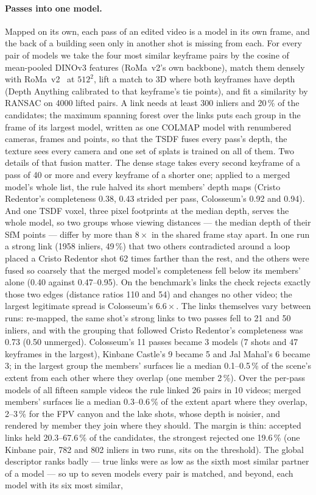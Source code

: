 \documentclass[10pt,a4paper,twocolumn]{article}
\begin{document}
\paragraph{Passes into one model.} Mapped on its own, each pass of an edited video is a model in its own frame, and the back of a building seen only in another shot is missing from each. For every pair of models we take the four most similar keyframe pairs by the cosine of mean-pooled DINOv3 features (RoMa~v2's own backbone), match them densely with RoMa~v2~\cite{edstedt2025romav2} at $512^2$, lift a match to 3D where both keyframes have depth (Depth Anything calibrated to that keyframe's tie points), and fit a similarity by RANSAC on 4000 lifted pairs. A link needs at least 300 inliers and 20\,\% of the candidates; the maximum spanning forest over the links puts each group in the frame of its largest model, written as one COLMAP model with renumbered cameras, frames and points, so that the TSDF fuses every pass's depth, the texture sees every camera and one set of splats is trained on all of them. Two details of that fusion matter. The dense stage takes every second keyframe of a pass of 40 or more and every keyframe of a shorter one; applied to a merged model's whole list, the rule halved its short members' depth maps (Cristo Redentor's completeness 0.38, 0.43 strided per pass, Colosseum's 0.92 and 0.94). And one TSDF voxel, three pixel footprints at the median depth, serves the whole model, so two groups whose viewing distances --- the median depth of their SfM points --- differ by more than $8\times$ in the shared frame stay apart. In one run a strong link (1958 inliers, 49\,\%) that two others contradicted around a loop placed a Cristo Redentor shot 62 times farther than the rest, and the others were fused so coarsely that the merged model's completeness fell below its members' alone (0.40 against 0.47--0.95). On the benchmark's links the check rejects exactly those two edges (distance ratios 110 and 54) and changes no other video; the largest legitimate spread is Colosseum's $6.6\times$. The links themselves vary between runs: re-mapped, the same shot's strong links to two passes fell to 21 and 50 inliers, and with the grouping that followed Cristo Redentor's completeness was 0.73 (0.50 unmerged). Colosseum's 11 passes became 3 models (7 shots and 47 keyframes in the largest), Kinbane Castle's 9 became 5 and Jal Mahal's 6 became 3; in the largest group the members' surfaces lie a median 0.1--0.5\,\% of the scene's extent from each other where they overlap (one member 2\,\%). Over the per-pass models of all fifteen sample videos the rule linked 26 pairs in 10 videos; merged members' surfaces lie a median 0.3--0.6\,\% of the extent apart where they overlap, 2--3\,\% for the FPV canyon and the lake shots, whose depth is noisier, and rendered by member they join where they should. The margin is thin: accepted links held 20.3--67.6\,\% of the candidates, the strongest rejected one 19.6\,\% (one Kinbane pair, 782 and 802 inliers in two runs, sits on the threshold). The global descriptor ranks badly --- true links were as low as the sixth most similar partner of a model --- so up to seven models every pair is matched, and beyond, each model with its six most similar, 
\end{document}
